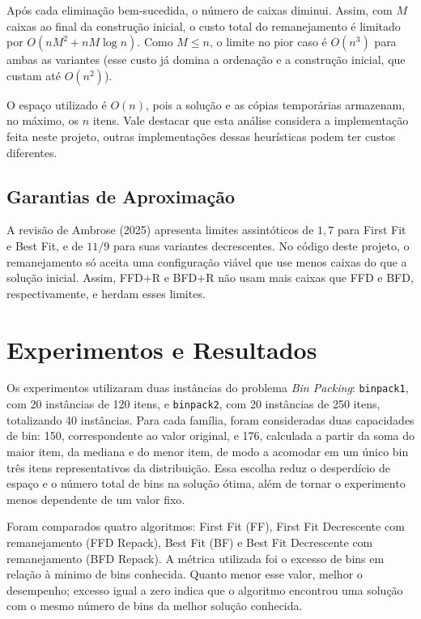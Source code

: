 \documentclass[12pt]{article}
\begin{document}
Após cada eliminação bem-sucedida, o número de caixas diminui. Assim, com $M$ caixas ao final da construção inicial, o custo total do remanejamento é limitado por $O(nM^2+nM\log n)$. Como $M\leq n$, o limite no pior caso é $O(n^3)$ para ambas as variantes (esse custo já domina a ordenação e a construção inicial, que custam até $O(n^2)$).

O espaço utilizado é $O(n)$, pois a solução e as cópias temporárias armazenam, no máximo, os $n$ itens. Vale destacar que esta análise considera a implementação feita neste projeto, outras implementações dessas heurísticas podem ter custos diferentes.

\subsection{Garantias  de Aproximação}

A revisão de Ambrose (2025) apresenta limites assintóticos de $1{,}7$ para First Fit e Best Fit, e de $11/9$ para suas variantes decrescentes. No código deste projeto, o remanejamento só aceita uma configuração viável que use menos caixas do que a solução inicial. Assim, FFD+R e BFD+R não usam mais caixas que FFD e BFD, respectivamente, e herdam esses limites.


\section{Experimentos e Resultados}

Os experimentos utilizaram duas instâncias do problema
\textit{Bin Packing}: \texttt{binpack1}, com 20 instâncias de 120 itens,
e \texttt{binpack2}, com 20 instâncias de 250 itens, totalizando
40 instâncias. Para cada família, foram consideradas duas capacidades
de bin: 150, correspondente ao valor original, e 176, calculada a
partir da soma do maior item, da mediana e do menor item, de modo a
acomodar em um único bin três itens representativos da distribuição.
Essa escolha reduz o desperdício de espaço e o número total de bins na
solução ótima, além de tornar o experimento menos dependente de um
valor fixo.

Foram comparados quatro algoritmos: First Fit (FF), First Fit
Decrescente com remanejamento (FFD Repack), Best Fit (BF) e Best Fit
Decrescente com remanejamento (BFD Repack). A métrica utilizada foi o
excesso de bins em relação à minimo de bins conhecida. Quanto menor
esse valor, melhor o desempenho; excesso igual a zero indica que o
algoritmo encontrou uma solução com o mesmo número de bins da melhor
solução conhecida.
\end{document}
